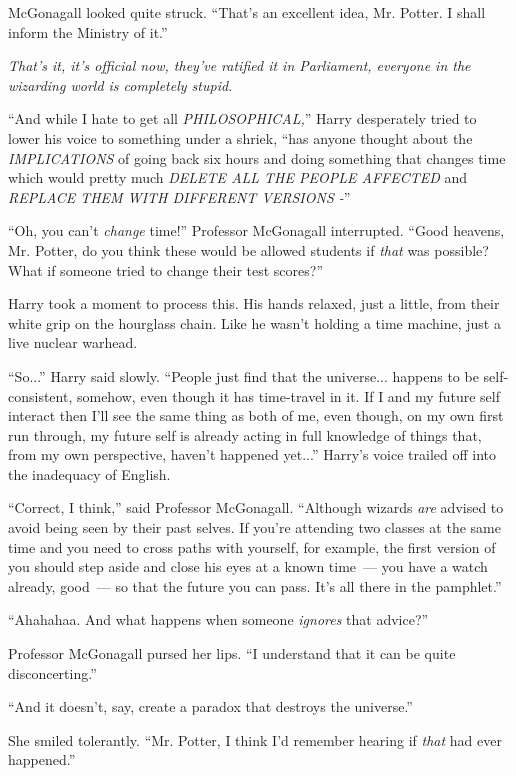 McGonagall looked quite struck. ``That's an excellent idea, Mr. Potter. I shall inform the Ministry of it.''

\emph{That's it, it's official now, they've ratified it in Parliament, everyone in the wizarding world is completely stupid.}

``And while I hate to get all \emph{PHILOSOPHICAL,}'' Harry desperately tried to lower his voice to something under a shriek, ``has anyone thought about the \emph{IMPLICATIONS} of going back six hours and doing something that changes time which would pretty much \emph{DELETE ALL THE PEOPLE AFFECTED} and \emph{REPLACE THEM WITH DIFFERENT VERSIONS -}''

``Oh, you can't \emph{change} time!'' Professor McGonagall interrupted. ``Good heavens, Mr. Potter, do you think these would be allowed students if \emph{that} was possible? What if someone tried to change their test scores?''

Harry took a moment to process this. His hands relaxed, just a little, from their white grip on the hourglass chain. Like he wasn't holding a time machine, just a live nuclear warhead.

``So...'' Harry said slowly. ``People just find that the universe... happens to be self-consistent, somehow, even though it has time-travel in it. If I and my future self interact then I'll see the same thing as both of me, even though, on my own first run through, my future self is already acting in full knowledge of things that, from my own perspective, haven't happened yet...'' Harry's voice trailed off into the inadequacy of English.

``Correct, I think,'' said Professor McGonagall. ``Although wizards \emph{are} advised to avoid being seen by their past selves. If you're attending two classes at the same time and you need to cross paths with yourself, for example, the first version of you should step aside and close his eyes at a known time~--- you have a watch already, good~--- so that the future you can pass. It's all there in the pamphlet.''

``Ahahahaa. And what happens when someone \emph{ignores} that advice?''

Professor McGonagall pursed her lips. ``I understand that it can be quite disconcerting.''

``And it doesn't, say, create a paradox that destroys the universe.''

She smiled tolerantly. ``Mr. Potter, I think I'd remember hearing if \emph{that} had ever happened.''


